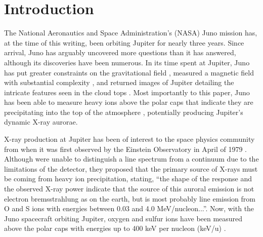 \documentclass[draft]{agujournal2018}
\begin{document}
\section{Introduction}

The National Aeronautics and Space Administration's (NASA) Juno mission has, at the time of this writing, been orbiting Jupiter for nearly three years.
Since arrival, Juno has arguably uncovered more questions than it has answered, although its discoveries have been numerous.
In its time spent at Jupiter, Juno has put greater constraints on the gravitational field \citep{folkner2017,iess2018}, measured a magnetic field with substantial complexity \citep{connerney2017,connerney2018,moore2018}, and returned images of Jupiter detailing the intricate features seen in the cloud tops \citep{orton2017,sanchez2018}.
Most importantly to this paper, Juno has been able to measure heavy ions above the polar caps that indicate they are precipitating into the top of the atmosphere \citep{haggerty2017,clark2017a,clark2017b}, potentially producing Jupiter's dynamic X-ray aurorae.

X-ray production at Jupiter has been of interest to the space physics community from when it was first observed by the Einstein Observatory in April of 1979 \citep{metzger1983}.
Although \citet{metzger1983} were unable to distinguish a line spectrum from a continuum due to the limitations of the detector, they proposed that the primary source of X-rays must be coming from heavy ion precipitation, stating, ``the shape of the response and the observed X-ray power indicate that the source of this auroral emission is not electron bremsstrahlung as on the earth, but is most probably line emission from O and S ions with energies between 0.03 and 4.0 MeV/nucleon...''.
Now, with the Juno spacecraft orbiting Jupiter, oxygen and sulfur ions have been measured above the polar caps with energies up to 400 keV per nucleon (keV/u) \citep{clark2017a,clark2017b,haggerty2017}. 
\end{document}
